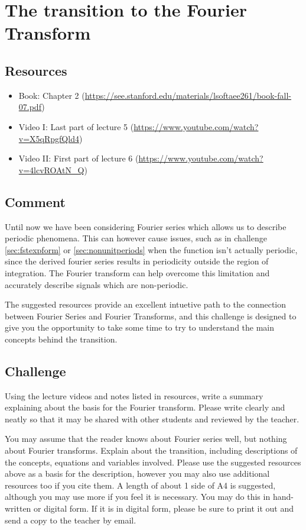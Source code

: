 \newpage
\section{The transition to the Fourier Transform}

\subsection*{Resources}
\begin{itemize}
    \item Book: Chapter 2 (\url{https://see.stanford.edu/materials/lsoftaee261/book-fall-07.pdf})
    \item Video I: Last part of lecture 5 (\url{https://www.youtube.com/watch?v=X5qRpgfQld4})
    \item Video II: First part of lecture 6 (\url{https://www.youtube.com/watch?v=4lcvROAtN_Q})
\end{itemize}

\subsection*{Comment}
Until now we have been considering Fourier series which allows us to describe periodic phenomena. This can however cause issues, such as in challenge \ref{sec:fstexpform} or \ref{sec:nonunitperiods} when the function isn't actually periodic, since the derived fourier series results in periodicity outside the region of integration. The Fourier transform can help overcome this limitation and accurately describe signals which are non-periodic.

The suggested resources provide an excellent intuetive path to the connection between Fourier Series and Fourier Transforms, and this challenge is designed to give you the opportunity to take some time to try to understand the main concepts behind the transition.

\subsection*{Challenge}
Using the lecture videos and notes listed in resources, write a summary explaining about the basis for the Fourier transform. Please write clearly and neatly so that it may be shared with other students and reviewed by the teacher.

You may assume that the reader knows about Fourier series well, but nothing about Fourier transforms. Explain about the transition, including descriptions of the concepts, equations and variables involved. Please use the suggested resources above as a basis for the description, however you may also use additional resources too if you cite them. A length of about 1 side of A4 is suggested, although you may use more if you feel it is necessary. You may do this in hand-written or digital form. If it is in digital form, please be sure to print it out and send a copy to the teacher by email.


